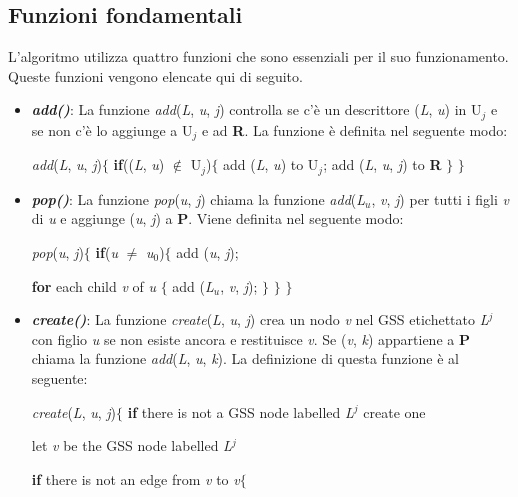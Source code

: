 \subsection{Funzioni fondamentali}\label{par}
L'algoritmo \cite{pubblicazione: scott} utilizza quattro funzioni che sono essenziali per il suo funzionamento. Queste funzioni vengono elencate qui di seguito.
\begin{itemize}
	\item \textbf{\textit{add()}}: La funzione \textit{add}(\textit{L}, \textit{u}, \textit{j}) controlla se c'è un descrittore (\textit{L}, \textit{u}) in U$_j$ e se non c'è lo aggiunge a U$_j$ e ad \textbf{R}. La funzione è definita nel seguente modo:\par 
	\textit{add}(\textit{L}, \textit{u}, \textit{j})$\{$ \textbf{if}((\textit{L}, \textit{u}) $\notin$ U$_j$)$\{$ add (\textit{L}, \textit{u}) to U$_j$; add (\textit{L}, \textit{u}, \textit{j}) to \textbf{R} $\}$ $\}$
	\item \textbf{\textit{pop()}}: La funzione \textit{pop}(\textit{u}, \textit{j}) chiama la funzione \textit{add}(\textit{L$_u$}, \textit{v}, \textit{j}) per tutti i figli \textit{v} di \textit{u} e aggiunge (\textit{u}, \textit{j}) a \textbf{P}. Viene definita nel seguente modo: \par
	\textit{pop}(\textit{u}, \textit{j})$\{$ \textbf{if}(\textit{u} $\ne$ \textit{u$_0$})$\{$ add (\textit{u}, \textit{j}); \par \hspace{4.1cm}\textbf{for} each child \textit{v} of \textit{u} $\{$ add (\textit{L$_u$}, \textit{v}, \textit{j}); $\}$ $\}$ $\}$
	\item \textbf{\textit{create()}}: La funzione \textit{create}(\textit{L}, \textit{u}, \textit{j}) crea un nodo \textit{v} nel GSS etichettato \textit{L}$^{j}$ con figlio \textit{u} se non esiste ancora e restituisce \textit{v}. Se (\textit{v}, \textit{k}) appartiene a \textbf{P} chiama la funzione \textit{add}(\textit{L}, \textit{u}, \textit{k}). La definizione di questa funzione è al seguente:\par 
	\textit{create}(\textit{L}, \textit{u}, \textit{j})$\{$ \textbf{if} there is not a GSS node labelled \textit{L$^{j}$} create one\par
	\hspace{3cm} let \textit{v} be the GSS node labelled \textit{L$^{j}$} \par
	\hspace{3cm} \textbf{if} there is not an edge from \textit{v} to \textit{v}$\{$ \par

\end{itemize}
